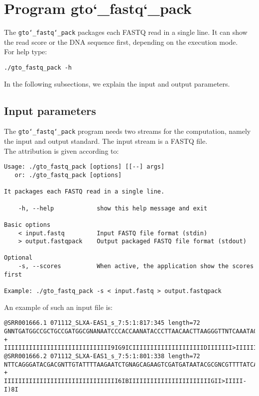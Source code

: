 \section{Program gto\char`_fastq\char`_pack}
The \texttt{gto\char`_fastq\char`_pack} packages each FASTQ read in a single line. It can show the read score or the DNA sequence first, depending on the execution mode. \\
For help type:
\begin{lstlisting}
./gto_fastq_pack -h
\end{lstlisting}
In the following subsections, we explain the input and output parameters.

\subsection*{Input parameters}

The \texttt{gto\char`_fastq\char`_pack} program needs two streams for the computation, namely the input and output standard. The input stream is a FASTQ file.\\
The attribution is given according to:
\begin{lstlisting}
Usage: ./gto_fastq_pack [options] [[--] args]
   or: ./gto_fastq_pack [options]

It packages each FASTQ read in a single line.

    -h, --help            show this help message and exit

Basic options
    < input.fastq         Input FASTQ file format (stdin)
    > output.fastqpack    Output packaged FASTQ file format (stdout)

Optional
    -s, --scores          When active, the application show the scores first

Example: ./gto_fastq_pack -s < input.fastq > output.fastqpack
\end{lstlisting}
An example of such an input file is:
\begin{lstlisting}
@SRR001666.1 071112_SLXA-EAS1_s_7:5:1:817:345 length=72
GNNTGATGGCCGCTGCCGATGGCGNANAATCCCACCAANATACCCTTAACAACTTAAGGGTTNTCAAATAGA
+
IIIIIIIIIIIIIIIIIIIIIIIIIIIIII9IG9ICIIIIIIIIIIIIIIIIIIIIDIIIIIII>IIIIII/
@SRR001666.2 071112_SLXA-EAS1_s_7:5:1:801:338 length=72
NTTCAGGGATACGACGNTTGTATTTTAAGAATCTGNAGCAGAAGTCGATGATAATACGCGNCGTTTTATCAN
+
IIIIIIIIIIIIIIIIIIIIIIIIIIIIIIII6IBIIIIIIIIIIIIIIIIIIIIIIIGII>IIIII-I)8I
\end{lstlisting}

